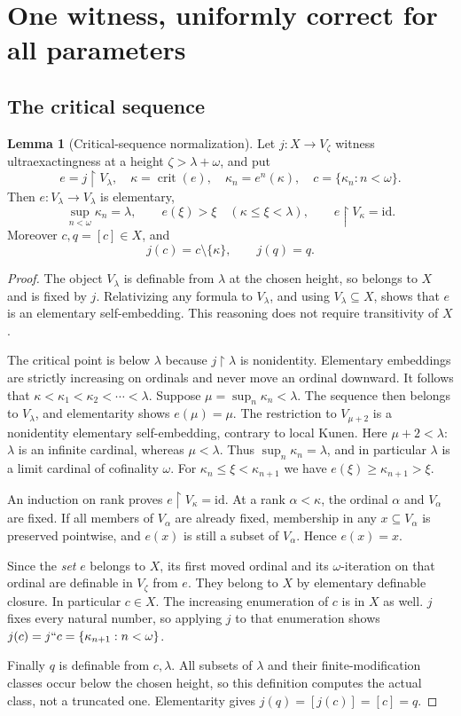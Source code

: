 \documentclass[11pt,letterpaper]{article}
\theoremstyle{definition}
\newtheorem{lemma}[definition]{Lemma}
\numberwithin{equation}{section}
\newcommand{\crit}{\operatorname{crit}}
\newcommand{\id}{\mathrm{id}}
\newcommand{\restr}{\mathbin{\upharpoonright}}
\begin{document}
\section{One witness, uniformly correct for all parameters}\label{sec:witness}

\subsection{The critical sequence}

\begin{lemma}[Critical-sequence normalization]\label{lem:critical}
Let $j:X\to V_\zeta$ witness ultraexactingness at a height
$\zeta>\lambda+\omega$, and put
\[
 e=j\restr V_\lambda,\quad \kappa=\crit(e),\quad
 \kappa_n=e^n(\kappa),\quad c=\{\kappa_n:n<\omega\}.
\]
Then $e:V_\lambda\to V_\lambda$ is elementary,
\[
 \sup_{n<\omega}\kappa_n=\lambda,\qquad
 e(\xi)>\xi\quad(\kappa\le\xi<\lambda),\qquad
 e\restr V_\kappa=\id.
\]
Moreover $c,q=[c]\in X$, and
\[
 j(c)=c\setminus\{\kappa\},\qquad j(q)=q.
\]
\end{lemma}

\begin{proof}
The object $V_\lambda$ is definable from $\lambda$ at the chosen height,
so belongs to $X$ and is fixed by $j$. Relativizing any formula to
$V_\lambda$, and using $V_\lambda\subseteq X$, shows that $e$ is
an elementary self-embedding. This reasoning does not require
transitivity of $X$.

The critical point is below $\lambda$ because $j\restr\lambda$ is
nonidentity. Elementary embeddings are strictly increasing on
ordinals and never move an ordinal downward. It follows that
$\kappa<\kappa_1<\kappa_2<\cdots<\lambda$.
Suppose $\mu=\sup_n\kappa_n<\lambda$. The sequence then belongs to
$V_\lambda$, and elementarity shows $e(\mu)=\mu$. The restriction to
$V_{\mu+2}$ is a nonidentity elementary self-embedding, contrary to
local Kunen. Here $\mu+2<\lambda$: $\lambda$ is an infinite cardinal,
whereas $\mu<\lambda$. Thus $\sup_n\kappa_n=\lambda$, and in particular
$\lambda$ is a limit cardinal of cofinality $\omega$.
For $\kappa_n\le\xi<\kappa_{n+1}$ we have
$e(\xi)\ge\kappa_{n+1}>\xi$.

An induction on rank proves $e\restr V_\kappa=\id$. At a rank
$\alpha<\kappa$, the ordinal $\alpha$ and $V_\alpha$ are fixed. If all
members of $V_\alpha$ are already fixed, membership in any
$x\subseteq V_\alpha$ is preserved pointwise, and $e(x)$ is still a
subset of $V_\alpha$. Hence $e(x)=x$.

Since the \emph{set} $e$ belongs to $X$, its first moved ordinal and its
$\omega$-iteration on that ordinal are definable in $V_\zeta$ from $e$.
They belong to $X$ by elementary definable closure. In particular
$c\in X$. The increasing enumeration of $c$ is in $X$ as well.
$j$ fixes every natural number, so applying $j$ to that enumeration
shows $j(c)=j``c=\{\kappa_{n+1}:n<\omega\}$.

Finally $q$ is definable from $c,\lambda$. All subsets of $\lambda$
and their finite-modification classes occur below the chosen height,
so this definition computes the actual class, not a truncated one.
Elementarity gives $j(q)=[j(c)]=[c]=q$.
\end{proof}
\end{document}
